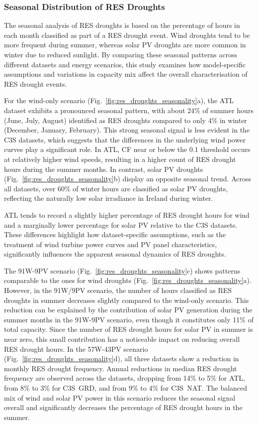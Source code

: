 \documentclass[preprint, 12pt]{elsarticle}
\begin{document}
\subsubsection{Seasonal Distribution of RES Droughts}

The seasonal analysis of RES droughts is based on the percentage of hours in each month classified as part of a RES drought event. Wind droughts tend to be more frequent during summer, whereas solar PV droughts are more common in winter due to reduced sunlight. By comparing these seasonal patterns across different datasets and energy scenarios, this study examines how model-specific assumptions and variations in capacity mix affect the overall characterisation of RES drought events.

For the wind-only scenario (Fig.~\ref{fig:res_droughts_seasonality}a), the ATL dataset exhibits a pronounced seasonal pattern, with about 24\% of summer hours (June, July, August) identified as RES droughts compared to only 4\% in winter (December, January, February). This strong seasonal signal is less evident in the C3S datasets, which suggests that the differences in the underlying wind power curves play a significant role. In ATL, CF near or below the 0.1 threshold occurs at relatively higher wind speeds, resulting in a higher count of RES drought hours during the summer months. In contrast, solar PV droughts (Fig.~\ref{fig:res_droughts_seasonality}b) display an opposite seasonal trend. Across all datasets, over 60\% of winter hours are classified as solar PV droughts, reflecting the naturally low solar irradiance in Ireland during winter. 

ATL tends to record a slightly higher percentage of RES drought hours for wind and a marginally lower percentage for solar PV relative to the C3S datasets. These differences highlight how dataset-specific assumptions, such as the treatment of wind turbine power curves and PV panel characteristics, significantly influences the apparent seasonal dynamics of RES droughts.

The 91W-9PV scenario (Fig.~\ref{fig:res_droughts_seasonality}c) shows patterns comparable to the ones for wind droughts (Fig.~\ref{fig:res_droughts_seasonality}a). However, in the 91W/9PV scenario, the number of hours classified as RES droughts in summer decreases slightly compared to the wind-only scenario. This reduction can be explained by the contribution of solar PV generation during the summer months in the 91W-9PV scenario, even though it constitutes only 11\% of total capacity. Since the number of RES drought hours for solar PV in summer is near zero, this small contribution has a noticeable impact on reducing overall RES drought hours. In the 57W-43PV scenario (Fig.~\ref{fig:res_droughts_seasonality}d), all three datasets show a reduction in monthly RES drought frequency. Annual reductions in median RES drought frequency are observed across the datasets, dropping from 14\% to 5\% for ATL, from 8\% to 3\% for C3S~GRD, and from 9\% to 4\% for C3S~NAT. The balanced mix of wind and solar PV power in this scenario reduces the seasonal signal overall and significantly decreases the percentage of RES drought hours in the summer.
\end{document}
